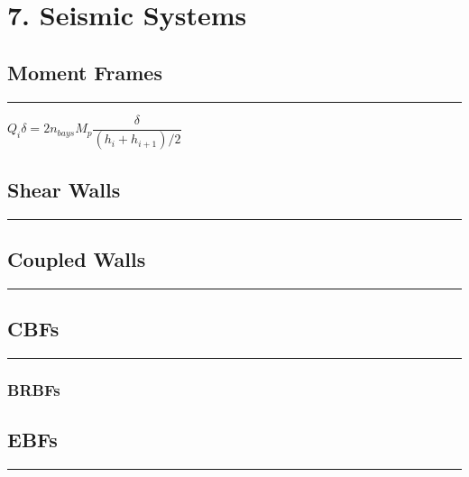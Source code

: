 \hypertarget{seismic-systems}{%
\section{7. Seismic Systems}\label{seismic-systems}}

\hypertarget{moment-frames}{%
\subsection{Moment Frames}\label{moment-frames}}

\begin{center}\rule{0.5\linewidth}{0.5pt}\end{center}

\(Q_i \delta = 2n_{bays}M_p\dfrac{\delta}{(h_i+h_{i+1})/2}\)

\hypertarget{shear-walls}{%
\subsection{Shear Walls}\label{shear-walls}}

\begin{center}\rule{0.5\linewidth}{0.5pt}\end{center}

\hypertarget{coupled-walls}{%
\subsection{Coupled Walls}\label{coupled-walls}}

\begin{center}\rule{0.5\linewidth}{0.5pt}\end{center}

\hypertarget{cbfs}{%
\subsection{CBFs}\label{cbfs}}

\begin{center}\rule{0.5\linewidth}{0.5pt}\end{center}

\hypertarget{brbfs}{%
\subsubsection{BRBFs}\label{brbfs}}

\hypertarget{ebfs}{%
\subsection{EBFs}\label{ebfs}}

\begin{center}\rule{0.5\linewidth}{0.5pt}\end{center}
